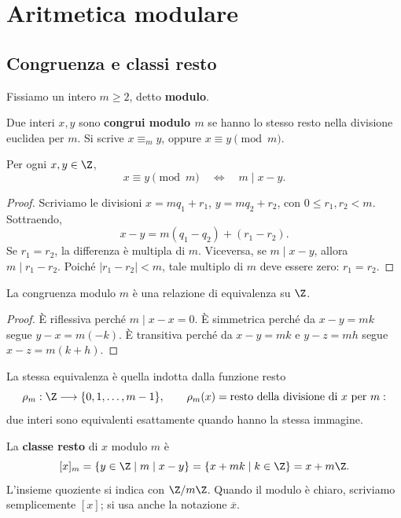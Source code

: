 \chapter{Aritmetica modulare}\label{cap:modulare}

\section{Congruenza e classi resto}
Fissiamo un intero $m\ge2$, detto \textbf{modulo}.
\begin{definizione}
Due interi $x,y$ sono \textbf{congrui modulo $m$} se hanno lo stesso resto nella divisione euclidea per $m$. Si scrive $x\equiv_m y$, oppure $x\equiv y\pmod m$.
\end{definizione}

\begin{proposizione}\label{prop:congruenza-divisibilita}
Per ogni $x,y\in\Z$,
\[
x\equiv y\pmod m\quad\Longleftrightarrow\quad m\mid x-y.
\]
\end{proposizione}
\begin{proof}
Scriviamo le divisioni $x=mq_1+r_1$, $y=mq_2+r_2$, con $0\le r_1,r_2<m$. Sottraendo,
\[
x-y=m(q_1-q_2)+(r_1-r_2).
\]
Se $r_1=r_2$, la differenza è multipla di $m$. Viceversa, se $m\mid x-y$, allora $m\mid r_1-r_2$. Poiché $|r_1-r_2|<m$, tale multiplo di $m$ deve essere zero: $r_1=r_2$.
\end{proof}

\begin{proposizione}
La congruenza modulo $m$ è una relazione di equivalenza su $\Z$.
\end{proposizione}
\begin{proof}
È riflessiva perché $m\mid x-x=0$. È simmetrica perché da $x-y=mk$ segue $y-x=m(-k)$. È transitiva perché da $x-y=mk$ e $y-z=mh$ segue $x-z=m(k+h)$.
\end{proof}

La stessa equivalenza è quella indotta dalla funzione resto
\[
\rho_m:\Z\longrightarrow\{0,1,\ldots,m-1\},\qquad
\rho_m(x)=\text{resto della divisione di $x$ per $m$}:
\]
due interi sono equivalenti esattamente quando hanno la stessa immagine.

\begin{definizione}
La \textbf{classe resto} di $x$ modulo $m$ è
\[
[x]_m=\{y\in\Z\mid m\mid x-y\}
     =\{x+mk\mid k\in\Z\}=x+m\Z.
\]
L'insieme quoziente si indica con $\Z/m\Z$. Quando il modulo è chiaro, scriviamo semplicemente $[x]$; si usa anche la notazione $\overline{x}$.
\end{definizione}

